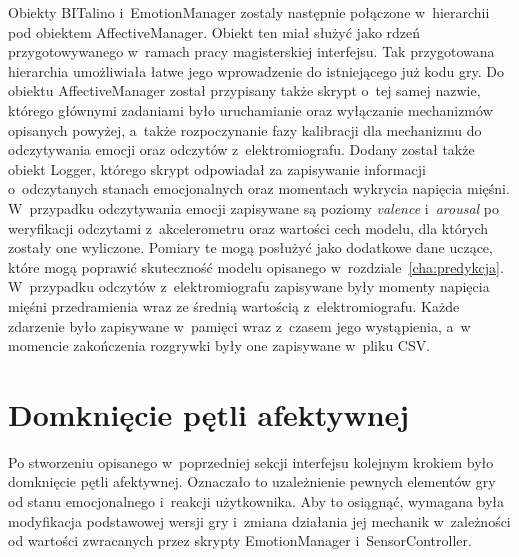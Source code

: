 Obiekty BITalino i~EmotionManager zostaly następnie połączone w~hierarchii pod obiektem AffectiveManager. Obiekt ten miał służyć jako rdzeń przygotowywanego w~ramach pracy magisterskiej interfejsu. Tak przygotowana hierarchia umożliwiała łatwe jego wprowadzenie do istniejącego już kodu gry. Do obiektu AffectiveManager został przypisany także skrypt o~tej samej nazwie, którego głównymi zadaniami było uruchamianie oraz wyłączanie mechanizmów opisanych powyżej, a~także rozpoczynanie fazy kalibracji dla mechanizmu do odczytywania emocji oraz odczytów z~elektromiografu. Dodany został także obiekt Logger, którego skrypt odpowiadał za zapisywanie informacji o~odczytanych stanach emocjonalnych oraz momentach wykrycia napięcia mięśni. W~przypadku odczytywania emocji zapisywane są poziomy \textit{valence} i~\textit{arousal} po weryfikacji odczytami z~akcelerometru oraz wartości cech modelu, dla których zostały one wyliczone. Pomiary te mogą posłużyć jako dodatkowe dane uczące, które mogą poprawić skuteczność modelu opisanego w~rozdziale~\ref{cha:predykcja}. W~przypadku odczytów z~elektromiografu zapisywane były momenty napięcia mięśni przedramienia wraz ze średnią wartością z~elektromiografu. Każde zdarzenie było zapisywane w~pamięci wraz z~czasem jego wystąpienia, a~w momencie zakończenia rozgrywki były one zapisywane w~pliku CSV.

\section{Domknięcie pętli afektywnej}
Po stworzeniu opisanego w~poprzedniej sekcji interfejsu kolejnym krokiem było domknięcie pętli afektywnej. Oznaczało to uzależnienie pewnych elementów gry od stanu emocjonalnego i~reakcji użytkownika. Aby to osiągnąć, wymagana była modyfikacja podstawowej wersji gry i~zmiana działania jej mechanik w~zależności od wartości zwracanych przez skrypty EmotionManager i~SensorController.

